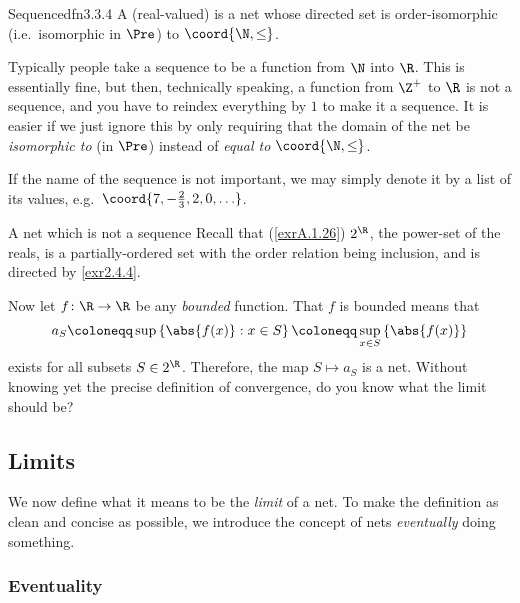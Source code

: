 \begin{dfn}{Sequence}{dfn3.3.4}
A (real-valued)  is a net whose directed set is order-isomorphic (i.e.~isomorphic in $\Pre$) to $\coord{\N ,\leq}$.
\begin{rmk}
Typically people take a sequence to be a function from $\N$ into $\R$.  This is essentially fine, but then, technically speaking, a function from $\Z ^+$ to $\R$ is not a sequence, and you have to reindex everything by $1$ to make it a sequence.  It is easier if we just ignore this by only requiring that the domain of the net be \emph{isomorphic to} (in $\Pre$) instead of \emph{equal to} $\coord{\N ,\leq}$.
\end{rmk}
\begin{rmk}
If the name of the sequence is not important, we may simply denote it by a list of its values, e.g.~$\coord{7,-\tfrac{2}{3},2,0,\ldots }$.
\end{rmk}
\end{dfn}
\begin{exm}{A net which is not a sequence}{}
Recall that (\cref{exrA.1.26}) $2^{\R}$, the power-set of the reals, is a partially-ordered set with the order relation being inclusion, and is directed by \cref{exr2.4.4}.

Now let $f\colon \R \rightarrow \R$ be any \emph{bounded} function.  That $f$ is bounded means that
\begin{equation}
a_S\coloneqq \sup \left\{ \abs{f(x)}:x\in S\right\} \coloneqq \sup _{x\in S}\left\{ \abs{f(x)}\right\}
\end{equation}
exists for all subsets $S\in 2^{\R}$.  Therefore, the map $S\mapsto a_S$ is a net.  Without knowing yet the precise definition of convergence, do you know what the limit should be?
\end{exm}

\subsection{Limits}

We now define what it means to be the \emph{limit} of a net.  To make the definition as clean and concise as possible, we introduce the concept of nets \emph{eventually} doing something.

\subsubsection{Eventuality}\label{sss2.4.2.1}

